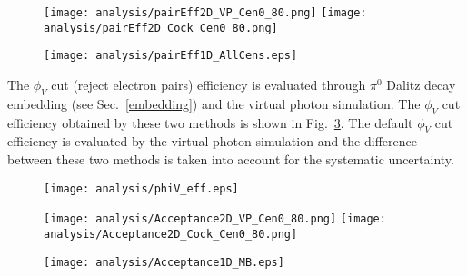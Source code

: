 \begin{figure}[htbp]
\centering
\texttt{[image: analysis/pairEff2D\_VP\_Cen0\_80.png]}
\texttt{[image: analysis/pairEff2D\_Cock\_Cen0\_80.png]}
\label{paireff2d}
\end{figure}

\begin{figure}[htbp]
\centering
\texttt{[image: analysis/pairEff1D\_AllCens.eps]}
 \label{paireff1d}
\end{figure}

The $\phi_{V}$ cut (reject electron pairs) efficiency is evaluated through $\pi^{0}$ Dalitz decay embedding (see Sec.~\ref{embedding}) and the virtual photon simulation. The $\phi_{V}$ cut efficiency obtained by these two methods is shown in Fig.~\ref{phiveff}. The default $\phi_{V}$ cut efficiency is evaluated by the virtual photon simulation and the difference between these two methods is taken into account for the systematic uncertainty.

\begin{figure}[htbp]
\centering
\texttt{[image: analysis/phiV\_eff.eps]}
 \label{phiveff}
\end{figure}

\begin{figure}[htbp]
\centering
\texttt{[image: analysis/Acceptance2D\_VP\_Cen0\_80.png]}
\texttt{[image: analysis/Acceptance2D\_Cock\_Cen0\_80.png]}
\label{acceptance2d}
\end{figure}

\begin{figure}[htbp]
\centering
\texttt{[image: analysis/Acceptance1D\_MB.eps]}
 \label{acceptance1d}
\end{figure}

